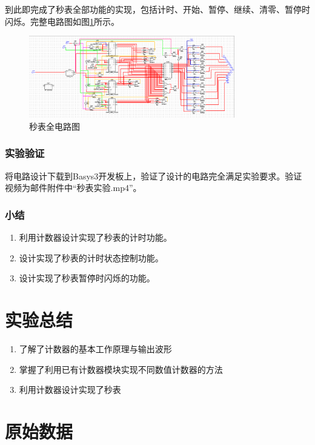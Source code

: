 \documentclass[UTF8]{ctexart}
\numberwithin{figure}{subsection}
\numberwithin{table}{subsection}
\numberwithin{equation}{subsection}
\begin{document}
\par 到此即完成了秒表全部功能的实现，包括计时、开始、暂停、继续、清零、暂停时闪烁。完整电路图如图\ref{watch circuit}所示。

\begin{figure}[H]
    \begin{center}
        \includegraphics[width=0.8\textwidth]{watch/whole circuit.png}
    \end{center}
    \caption{秒表全电路图}
    \label{watch circuit}
\end{figure}

\subsubsection{实验验证}
\par 将电路设计下载到Basys3开发板上，验证了设计的电路完全满足实验要求。验证视频为邮件附件中“秒表实验.mp4”。

\subsubsection{小结}
\begin{enumerate}
    \item 利用计数器设计实现了秒表的计时功能。
    \item 设计实现了秒表的计时状态控制功能。
    \item 设计实现了秒表暂停时闪烁的功能。
\end{enumerate}

\section{实验总结}
\begin{enumerate}
    \item 了解了计数器的基本工作原理与输出波形
    \item 掌握了利用已有计数器模块实现不同数值计数器的方法
    \item 利用计数器设计实现了秒表
\end{enumerate}

\section*{原始数据}
\end{document}
